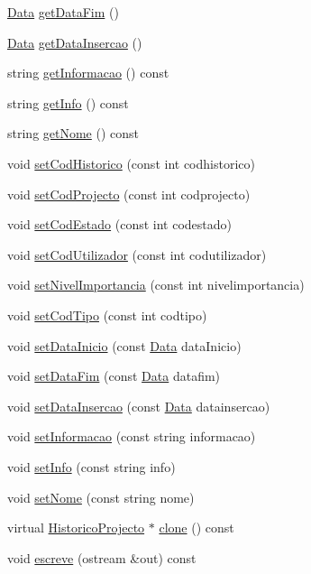 \begin{DoxyCompactItemize}
\item 
\hyperlink{class_data}{Data} \hyperlink{class_historico_projecto_a4be29dd4292fbb057c90e86ab5f74d4b}{get\-Data\-Fim} ()
\item 
\hyperlink{class_data}{Data} \hyperlink{class_historico_projecto_a0ff71310115cd6958c439d882bde36b2}{get\-Data\-Insercao} ()
\item 
string \hyperlink{class_historico_projecto_a6ee105bb904f8628ab3a0835cefe68f3}{get\-Informacao} () const 
\item 
string \hyperlink{class_historico_projecto_a409908214ca977d7b91cde4a71d650b5}{get\-Info} () const 
\item 
string \hyperlink{class_historico_projecto_a4a632b8fa3ad802c003b7f8a321b8129}{get\-Nome} () const 
\item 
void \hyperlink{class_historico_projecto_ab65e809fe910e6a42b54057b6fd6a482}{set\-Cod\-Historico} (const int codhistorico)
\item 
void \hyperlink{class_historico_projecto_a2f2e4dfb6ec855c5c6871f65cc0a3f8e}{set\-Cod\-Projecto} (const int codprojecto)
\item 
void \hyperlink{class_historico_projecto_a90bce2760020c91f429ba56d01b3abf6}{set\-Cod\-Estado} (const int codestado)
\item 
void \hyperlink{class_historico_projecto_ac7f019cfd3b0b9babf023a6c00a5d055}{set\-Cod\-Utilizador} (const int codutilizador)
\item 
void \hyperlink{class_historico_projecto_a071b1c40db28005e4a0e4588697de2b6}{set\-Nivel\-Importancia} (const int nivelimportancia)
\item 
void \hyperlink{class_historico_projecto_af3f0128d80fc8bd1ea59a11270beb1f3}{set\-Cod\-Tipo} (const int codtipo)
\item 
void \hyperlink{class_historico_projecto_a171b52f01bbbed61b2493a7928dc10d8}{set\-Data\-Inicio} (const \hyperlink{class_data}{Data} data\-Inicio)
\item 
void \hyperlink{class_historico_projecto_a10a82cf8ec65878a1f9805f3b2683607}{set\-Data\-Fim} (const \hyperlink{class_data}{Data} datafim)
\item 
void \hyperlink{class_historico_projecto_a29b4f71b3ba55f8d26b09c1fbe928617}{set\-Data\-Insercao} (const \hyperlink{class_data}{Data} datainsercao)
\item 
void \hyperlink{class_historico_projecto_a48b679bdc8388dc281fd841fa0133745}{set\-Informacao} (const string informacao)
\item 
void \hyperlink{class_historico_projecto_a1cb6b08ffdce2e70244c1b47acd002ba}{set\-Info} (const string info)
\item 
void \hyperlink{class_historico_projecto_a64b451edc9222f355bd07b4d16d19c94}{set\-Nome} (const string nome)
\item 
virtual \hyperlink{class_historico_projecto}{Historico\-Projecto} $\ast$ \hyperlink{class_historico_projecto_a02b6ddb9a38ea2ead067b0d1e8330ed0}{clone} () const 
\item 
void \hyperlink{class_historico_projecto_a8112c1ba995502613166710c01080db5}{escreve} (ostream \&out) const 
\end{DoxyCompactItemize}


